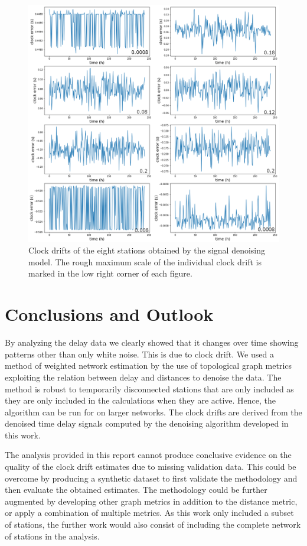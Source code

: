 \documentclass[12pt, sumlimits, intlimits]{article}
\begin{document}
\begin{figure}[ht]
\centering
\includegraphics[height=0.9\textwidth]{../figures/results-for-eight-network.png}
\caption{Clock drifts of the eight stations obtained by the signal denoising model. The rough maximum scale of the individual clock drift is marked in the low right  corner of each figure.}
\label{fig:clockdeviations}
\end{figure}



\section{Conclusions and Outlook}
By analyzing the delay data we clearly showed that it changes over time showing patterns other than only white noise. This is due to clock drift. We used a method of weighted network estimation by the use of topological graph metrics exploiting the relation between delay and distances to denoise the data. The method is robust to temporarily disconnected stations that are only included as they are only included in the calculations when they are active. Hence, the algorithm can be run for on larger networks. The clock drifts are derived from the denoised time delay signals computed by the denoising algorithm developed in this work. 

The analysis provided in this report cannot produce conclusive evidence on the quality of the clock drift estimates due to missing validation data. This could be overcome by producing a synthetic dataset to first validate the methodology and then evaluate the obtained estimates. The methodology could be further augmented by developing other graph metrics in addition to the distance metric, or apply a combination of multiple metrics. As this work only included a subset of stations, the further work would also consist of including the complete network of stations in the analysis. 
\end{document}
